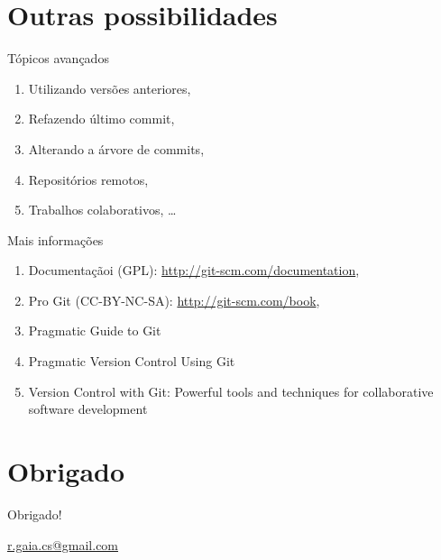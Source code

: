 \documentclass[11pt]{beamer}
\begin{document}
\section{Outras possibilidades}
\begin{frame}{Tópicos avançados}
    \begin{enumerate}
        \item Utilizando versões anteriores, \pause
        \item Refazendo último commit, \pause
        \item Alterando a árvore de commits, \pause
        \item Repositórios remotos, \pause
        \item Trabalhos colaborativos, \ldots
    \end{enumerate}
\end{frame}

\begin{frame}{Mais informações}
    \begin{enumerate}
        \item Documentaçãoi (GPL): \url{http://git-scm.com/documentation},
        \item Pro Git (CC-BY-NC-SA): \url{http://git-scm.com/book},
        \item Pragmatic Guide to Git
        \item Pragmatic Version Control Using Git
        \item Version Control with Git: Powerful tools and techniques for
            collaborative software development
    \end{enumerate}
\end{frame}

\section*{Obrigado}
\begin{frame}
    \begin{center}
        Obrigado!
    \end{center}
    \begin{center}
        \url{r.gaia.cs@gmail.com}
    \end{center}
\end{frame}
\end{document}
